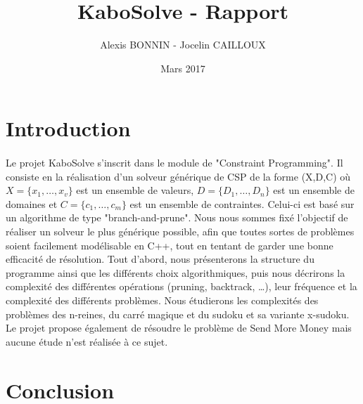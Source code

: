 \documentclass[11pt]{article}
\title{KaboSolve - Rapport}
\author{Alexis BONNIN - Jocelin CAILLOUX}
\date{Mars 2017}
\begin{document}
\maketitle

\tableofcontents
\newpage

\section{Introduction}

\paragraph{}
Le projet KaboSolve s'inscrit dans le module de "Constraint Programming". Il consiste en la réalisation d'un solveur générique de CSP de la forme (X,D,C) où $X = \{x_1, \ldots, x_v\}$ est un ensemble de valeurs, $D = \{D_1, \ldots, D_n\}$ est un ensemble de domaines et $C = \{c_1, \ldots, c_m\}$ est un ensemble de contraintes. Celui-ci est basé sur un algorithme de type "branch-and-prune". Nous nous sommes fixé l'objectif de réaliser un solveur le plus générique possible, afin que toutes sortes de problèmes soient facilement modélisable en C++, tout en tentant de garder une bonne efficacité de résolution. Tout d'abord, nous présenterons la structure du programme ainsi que les différents choix algorithmiques, puis nous décrirons la complexité des différentes opérations (pruning, backtrack, \dots), leur fréquence et la complexité des différents problèmes. Nous étudierons les complexités des problèmes des n-reines, du carré magique et du sudoku et sa variante x-sudoku. Le projet propose également de résoudre le problème de Send More Money mais aucune étude n'est réalisée à ce sujet.


\FloatBarrier


\FloatBarrier


\FloatBarrier

\section{Conclusion}
\end{document}
